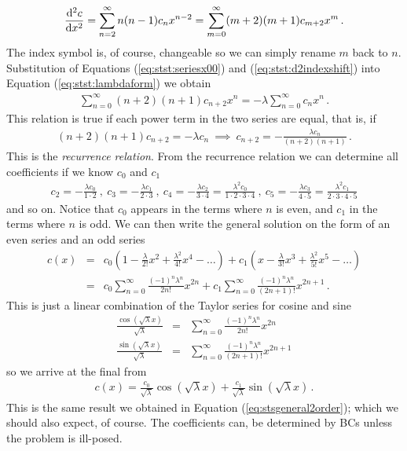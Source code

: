 \begin{example}
	\begin{eqnarray}
		\label{eq:stst:d2indexshift}
		\frac{\mathrm{d}^2c}{\mathrm{d} x^2}= \sum_{n=2}^\infty n(n-1) c_n x^{n-2} = \sum_{m=0}^\infty (m+2)(m+1)
		c_{m+2} x^m \, .
	\end{eqnarray}
	The index symbol is, of course, changeable so we can simply rename $m$ back to $n$. 
	Substitution of Equations (\ref{eq:stst:seriesx00}) and (\ref{eq:stst:d2indexshift}) into
	Equation (\ref{eq:stst:lambdaform}) we obtain
	\begin{eqnarray}
		\sum_{n=0}^\infty (n+2)(n+1)c_{n+2}x^n = -\lambda \sum_{n=0}^\infty c_n x^n \, . 
	\end{eqnarray}
	This relation is true if each power term in the two series are equal, that is, if
	\begin{eqnarray}
		(n+2)(n+1)c_{n+2} = -\lambda c_n \ \implies  \ c_{n+2} = -\frac{\lambda c_n}{(n+2)(n+1)} \, .
	\end{eqnarray}
	This is the \emph{recurrence relation}. From the recurrence relation we can determine all
	coefficients if we know $c_0$ and $c_1$
	\begin{eqnarray}
		c_2 = -\frac{\lambda c_0}{1\cdot 2} \ , \ c_3 = -\frac{\lambda c_1}{2\cdot 3} \ , \ 
		c_4 = -\frac{\lambda c_2}{3\cdot4} = \frac{\lambda^2c_0}{1\cdot2\cdot3\cdot4} \  , \ 
		c_5 = -\frac{\lambda c_3}{4\cdot5} = \frac{\lambda^2c_1}{2\cdot3\cdot4\cdot5}  \nonumber 
	\end{eqnarray}
	and so on. Notice that $c_0$ appears in the terms where $n$ is even, and $c_1$ in the terms where $n$ is
	odd. We can then write the general solution on the form of an even series and an odd series 
	\begin{eqnarray}
		c(x) &=& c_0\left(1 - \frac{\lambda}{2!}x^2 + \frac{\lambda^2}{4!}x^4 - \ldots\right) 
				+ c_1 \left(x- \frac{\lambda}{3!}x^3 + \frac{\lambda^2}{5!}x^5 - \ldots\right) 
				\nonumber \\
				&=& c_0 \sum_{n=0}^\infty \frac{(-1)^n \lambda^n}{2n!}x^{2n} + c_1 \sum_{n=0}^\infty 
				\frac{(-1)^n \lambda^n}{(2n+1)!}x^{2n+1} \, .
	\end{eqnarray}
	This is just a linear combination of the Taylor series for cosine and sine
	\begin{eqnarray}
		\frac{\cos(\sqrt{\lambda}x)}{\sqrt{\lambda}} &=&  \sum_{n=0}^\infty \frac{(-1)^n \lambda^n}{2n!}x^{2n} 
		\nonumber	\\
		\frac{\sin(\sqrt{\lambda}x)}{\sqrt{\lambda}} &=&   \sum_{n=0}^\infty 
				\frac{(-1)^n \lambda^n}{(2n+1)!}x^{2n+1} 
	\end{eqnarray}
	so we arrive at the final from
	\begin{eqnarray}
		c(x) = \frac{c_0}{\sqrt{\lambda}} \cos(\sqrt{\lambda} x) 
		+ \frac{c_1}{\sqrt{\lambda}} \sin(\sqrt{\lambda} x) \, .
	\end{eqnarray}
	This is the same result we obtained in Equation (\ref{eq:stsgeneral2order}); which we
	should also expect, of course. The coefficients can, be determined by BCs unless the problem is
	ill-posed.    
\end{example}

